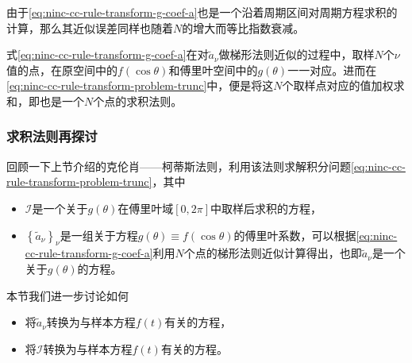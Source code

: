 由于\eqref{eq:ninc-cc-rule-transform-g-coef-a}也是一个沿着周期区间对周期方程求积的计算，那么其近似误差同样也随着$N$的增大而等比指数衰减。

式\eqref{eq:ninc-cc-rule-transform-g-coef-a}在对$\tilde{a}_{\nu}$做梯形法则近似的过程中，取样$N$个$\nu$值的点，在原空间中的$f(\cos \theta)$和傅里叶空间中的$g(\theta)$一一对应。进而在\eqref{eq:ninc-cc-rule-transform-problem-trunc}中，便是将这$N$个取样点对应的值加权求和，即也是一个$N$个点的求积法则。


\subsubsection{求积法则再探讨}
回顾一下上节介绍的克伦肖——柯蒂斯法则，利用该法则求解积分问题\eqref{eq:ninc-cc-rule-transform-problem-trunc}，其中
\begin{itemize}
  \item $\mathcal{I}$是一个关于$g(\theta)$在傅里叶域$[0,2 \pi]$中取样后求积的方程，
  \item $\left\{ \tilde{a}_{\nu} \right\}_{\nu}$是一组关于方程$g(\theta) \equiv f \left( \cos \theta \right)$的傅里叶系数，可以根据\eqref{eq:ninc-cc-rule-transform-g-coef-a}利用$N$个点的梯形法则近似计算得出，也即$\tilde{a}_{\nu}$是一个关于$g(\theta)$的方程。
\end{itemize}

本节我们进一步讨论如何
\begin{itemize}
  \item 将$\tilde{a}_{\nu}$转换为与样本方程$f(t)$有关的方程，
  \item 将$\mathcal{I}$转换为与样本方程$f(t)$有关的方程。
\end{itemize}

